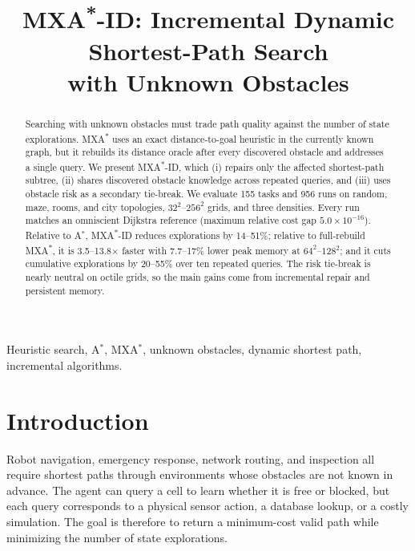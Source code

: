 \documentclass[conference]{IEEEtran}
\newcommand{\MXA}{MXA\textsuperscript{*}}
\newcommand{\MXAID}{MXA\textsuperscript{*}-ID}
\begin{document}
\title{\MXAID: Incremental Dynamic Shortest-Path Search\\with Unknown Obstacles}

\author{
}

\maketitle

\begin{abstract}
Searching with unknown obstacles must trade path quality against the number of state explorations. \MXA{} uses an exact distance-to-goal heuristic in the currently known graph, but it rebuilds its distance oracle after every discovered obstacle and addresses a single query. We present \MXAID, which (i) repairs only the affected shortest-path subtree, (ii) shares discovered obstacle knowledge across repeated queries, and (iii) uses obstacle risk as a secondary tie-break. We evaluate 155 tasks and 956 runs on random, maze, rooms, and city topologies, $32^2$--$256^2$ grids, and three densities. Every run matches an omniscient Dijkstra reference (maximum relative cost gap $5.0\times10^{-16}$). Relative to A$^*$, \MXAID{} reduces explorations by 14--51\%; relative to full-rebuild \MXA{}, it is 3.5--13.8$\times$ faster with 7.7--17\% lower peak memory at $64^2$--$128^2$; and it cuts cumulative explorations by 20--55\% over ten repeated queries. The risk tie-break is nearly neutral on octile grids, so the main gains come from incremental repair and persistent memory.
\end{abstract}

\begin{IEEEkeywords}
Heuristic search, A$^*$, MXA$^*$, unknown obstacles, dynamic shortest path, incremental algorithms.
\end{IEEEkeywords}

\section{Introduction}
Robot navigation, emergency response, network routing, and inspection all require shortest paths through environments whose obstacles are not known in advance. The agent can query a cell to learn whether it is free or blocked, but each query corresponds to a physical sensor action, a database lookup, or a costly simulation. The goal is therefore to return a minimum-cost valid path while minimizing the number of state explorations.
\end{document}
